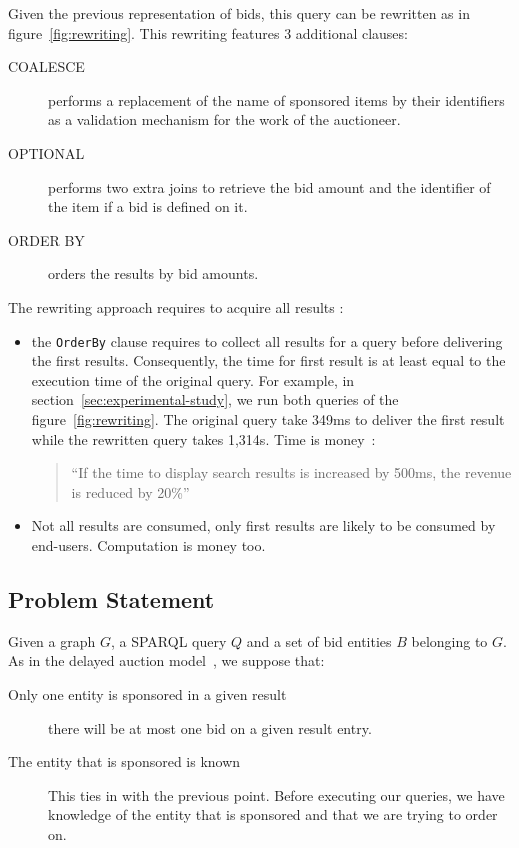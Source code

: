 \documentclass[runningheads]{llncs}
\begin{document}


Given the previous representation of bids, this query  can be rewritten as in
figure~\ref{fig:rewriting}. This rewriting features 3 additional clauses:
\begin{description}
\item[COALESCE] performs a replacement of the name of sponsored items
  by their identifiers as a validation mechanism for the work of the
  auctioneer.
\item[OPTIONAL] performs two extra joins to retrieve the bid amount
  and the identifier of the item if a bid is defined on it.
\item[ORDER BY] orders the results by bid amounts.
\end{description}

The rewriting approach requires to acquire all results :

\begin{itemize}

\item the \verb+OrderBy+ clause requires to collect all results for a
  query before delivering the first results. 
  Consequently, the time for first result is at least equal to the execution time of the original query. For
  example, in section~\ref{sec:experimental-study}, we run both
  queries of the figure~\ref{fig:rewriting}. The original query take 349ms
  to deliver the first result while the rewritten query takes
  1,314s. Time is money~\cite{kohavi2009controlled}:
   \begin{quote}
    “If the time to display search results is increased by 500ms, the
    revenue is reduced by 20\%”
  \end{quote}
\item  Not all results are consumed, only first results are likely to be consumed by end-users. Computation is money too.  

\end{itemize} 

\subsection{Problem Statement}

Given a graph $G$, a SPARQL query $Q$ and a set of bid entities $B$
belonging to $G$.  As in the delayed auction 
model~\cite{DBLP:conf/www/GrubenmannBMS18}, we suppose that:
\begin{description}
\item[Only one entity is sponsored in a given result] there will be at
  most one bid on a given result entry.  %

\item[The entity that is sponsored is known] This ties in with
  the previous point. Before executing our queries, we have knowledge
  of the entity that is sponsored and that we are trying to order
  on. 
\end{description}
\end{document}
